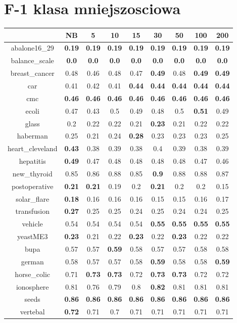 \documentclass{article}%
\begin{document}
%
\section*{F{-}1 klasa mniejszosciowa}%
\begin{tabular}{c|cccccccc}%
\hline%
&NB&5&10&15&30&50&100&200\\%
\hline%
abalone16\_29&\textbf{0.19}&\textbf{0.19}&\textbf{0.19}&\textbf{0.19}&\textbf{0.19}&\textbf{0.19}&\textbf{0.19}&\textbf{0.19}\\%
\hline%
balance\_scale&\textbf{0.0}&\textbf{0.0}&\textbf{0.0}&\textbf{0.0}&\textbf{0.0}&\textbf{0.0}&\textbf{0.0}&\textbf{0.0}\\%
\hline%
breast\_cancer&0.48&0.46&0.48&0.47&\textbf{0.49}&0.48&\textbf{0.49}&\textbf{0.49}\\%
\hline%
car&0.41&0.42&0.41&\textbf{0.44}&\textbf{0.44}&\textbf{0.44}&\textbf{0.44}&\textbf{0.44}\\%
\hline%
cmc&\textbf{0.46}&\textbf{0.46}&\textbf{0.46}&\textbf{0.46}&\textbf{0.46}&\textbf{0.46}&\textbf{0.46}&\textbf{0.46}\\%
\hline%
ecoli&0.47&0.43&0.5&0.49&0.48&0.5&\textbf{0.51}&0.49\\%
\hline%
glass&0.2&0.22&0.22&0.21&\textbf{0.23}&0.21&0.22&0.22\\%
\hline%
haberman&0.25&0.21&0.24&\textbf{0.28}&0.23&0.23&0.23&0.25\\%
\hline%
heart\_cleveland&\textbf{0.43}&0.38&0.39&0.38&0.4&0.39&0.38&0.39\\%
\hline%
hepatitis&\textbf{0.49}&0.47&0.48&0.48&0.48&0.48&0.47&0.46\\%
\hline%
new\_thyroid&0.85&0.86&0.88&0.85&\textbf{0.9}&0.88&0.88&0.87\\%
\hline%
postoperative&\textbf{0.21}&\textbf{0.21}&0.19&0.2&\textbf{0.21}&0.2&0.2&0.15\\%
\hline%
solar\_flare&\textbf{0.18}&0.16&0.16&0.16&0.15&0.15&0.16&0.17\\%
\hline%
transfusion&\textbf{0.27}&0.25&0.25&0.24&0.25&0.24&0.24&0.25\\%
\hline%
vehicle&0.54&0.54&0.54&0.54&\textbf{0.55}&\textbf{0.55}&\textbf{0.55}&\textbf{0.55}\\%
\hline%
yeastME3&\textbf{0.23}&0.21&0.22&\textbf{0.23}&0.22&\textbf{0.23}&0.22&0.22\\%
\hline%
bupa&0.57&0.57&\textbf{0.59}&0.58&0.57&0.57&0.58&0.58\\%
\hline%
german&0.58&0.57&0.57&0.58&\textbf{0.59}&0.58&0.58&\textbf{0.59}\\%
\hline%
horse\_colic&0.71&\textbf{0.73}&\textbf{0.73}&0.72&\textbf{0.73}&\textbf{0.73}&0.72&0.72\\%
\hline%
ionosphere&0.81&0.76&0.79&0.8&\textbf{0.82}&0.81&0.81&0.81\\%
\hline%
seeds&\textbf{0.86}&\textbf{0.86}&\textbf{0.86}&\textbf{0.86}&\textbf{0.86}&\textbf{0.86}&\textbf{0.86}&\textbf{0.86}\\%
\hline%
vertebal&\textbf{0.72}&0.71&0.7&0.71&0.71&0.71&0.71&0.71\\%
\hline%
\end{tabular}
\end{document}
